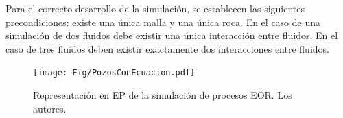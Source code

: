 Para el correcto desarrollo de la simulación, se establecen las siguientes precondiciones: existe una única malla y una única roca. En el caso de una simulación de dos fluidos debe existir una única interacción entre fluidos. En el caso de tres fluidos deben existir exactamente dos interacciones entre fluidos.


\begin{figure}[h]
\centering%
\texttt{[image: Fig/PozosConEcuacion.pdf]}%
\caption{Representación en EP de la simulación de procesos EOR. Los autores.} \label{fig:PSComplete}
\end{figure}

